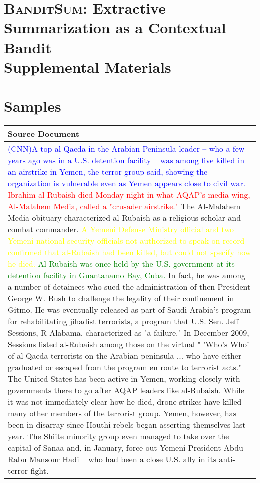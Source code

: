\documentclass[11pt,a4paper]{article}
\begin{document}
\section*{\textsc{BanditSum}: Extractive Summarization as a Contextual Bandit\\Supplemental Materials}
\appendix

\section{Samples}
\begin{table}[h!]
\begin{center}
\begin{tabularx}{\columnwidth}{|X|}
\hline
\textbf{Source Document} \\ 
\hline
\textcolor{blue}{(CNN)A top al Qaeda in the Arabian Peninsula leader -- who a few years ago was in a U.S. detention facility -- was among five killed in an airstrike in Yemen, the terror group said, showing the organization is vulnerable even as Yemen appears close to civil war.}
\textcolor{red}{Ibrahim al-Rubaish died Monday night in what AQAP's media wing, Al-Malahem Media, called a "crusader airstrike."} 
The Al-Malahem Media obituary characterized al-Rubaish as a religious scholar and combat commander.
\textcolor{yellow}{A Yemeni Defense Ministry official and two Yemeni national security officials not authorized to speak on record confirmed that al-Rubaish had been killed, but could not specify how he died.}
\textcolor{green}{Al-Rubaish was once held by the U.S. government at its detention facility in Guantanamo Bay, Cuba.} 
In fact, he was among a number of detainees who sued the administration of then-President George W. Bush to challenge the legality of their confinement in Gitmo.
He was eventually released as part of Saudi Arabia's program for rehabilitating jihadist terrorists, a program that U.S. Sen. Jeff Sessions, R-Alabama, characterized as "a failure." In December 2009, Sessions listed al-Rubaish among those on the virtual " 'Who's Who' of al Qaeda terrorists on the Arabian peninsula ... who have either graduated or escaped from the program en route to terrorist acts."
The United States has been active in Yemen, working closely with governments there to go after AQAP leaders like al-Rubaish. While it was not immediately clear how he died, drone strikes have killed many other members of the terrorist group.
Yemen, however, has been in disarray since Houthi rebels began asserting themselves last year. The Shiite minority group even managed to take over the capital of Sanaa and, in January, force out Yemeni President Abdu Rabu Mansour Hadi -- who had been a close U.S. ally in its anti-terror fight.

\end{tabularx}
\end{center}
\end{table}
\end{document}
